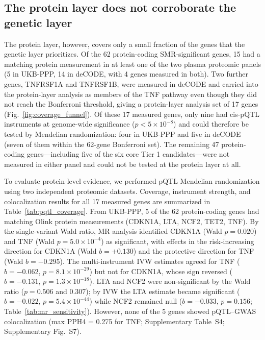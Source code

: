 \documentclass[11pt,a4paper]{article}
\begin{document}
\subsection{The protein layer does not corroborate the genetic layer}

The protein layer, however, covers only a small fraction of the genes that the
genetic layer prioritizes. Of the 62 protein-coding SMR-significant genes, 15 had
a matching protein measurement in at least one of the two plasma proteomic panels
(5 in UKB-PPP, 14 in deCODE, with 4 genes measured in both). Two further genes,
TNFRSF1A and TNFRSF1B, were measured in deCODE and carried into the protein-layer
analysis as members of the TNF pathway even though they did not reach the
Bonferroni threshold, giving a protein-layer analysis set of 17 genes
(Fig.~\ref{fig:coverage_funnel}). Of these 17 measured genes, only nine had cis-pQTL
instruments at genome-wide significance ($p < 5\times10^{-8}$) and could therefore
be tested by Mendelian randomization: four in UKB-PPP and five in deCODE (seven of
them within the 62-gene Bonferroni set). The remaining 47 protein-coding
genes---including five of the six core Tier 1 candidates---were not measured in
either panel and could not be tested at the protein layer at all.

To evaluate protein-level evidence, we performed pQTL Mendelian randomization
using two independent proteomic datasets. Coverage, instrument strength, and
colocalization results for all 17 measured genes are summarized in
Table~\ref{tab:pqtl_coverage}. From UKB-PPP, 5 of the 62
protein-coding genes had matching Olink protein measurements (CDKN1A, LTA,
NCF2, TET2, TNF). By the single-variant Wald ratio, MR analysis identified
CDKN1A (Wald $p = 0.020$) and TNF (Wald $p = 5.0\times10^{-4}$) as significant,
with effects in the risk-increasing direction for CDKN1A (Wald $b = +0.130$) and
the protective direction for TNF (Wald $b = -0.295$). The multi-instrument IVW
estimates agreed for TNF ($b = -0.062$, $p = 8.1\times10^{-29}$) but not for
CDKN1A, whose sign reversed ($b = -0.131$, $p = 1.3\times10^{-18}$). LTA and NCF2
were non-significant by the Wald ratio ($p = 0.506$ and $0.307$); by IVW the LTA
estimate became significant ($b = -0.022$, $p = 5.4\times10^{-44}$) while NCF2
remained null ($b = -0.033$, $p = 0.156$; Table~\ref{tab:mr_sensitivity}). However, none of the 5 genes showed pQTL--GWAS colocalization (max PPH4 = 0.275 for TNF; Supplementary Table~S4; Supplementary Fig.~S7).
\end{document}
